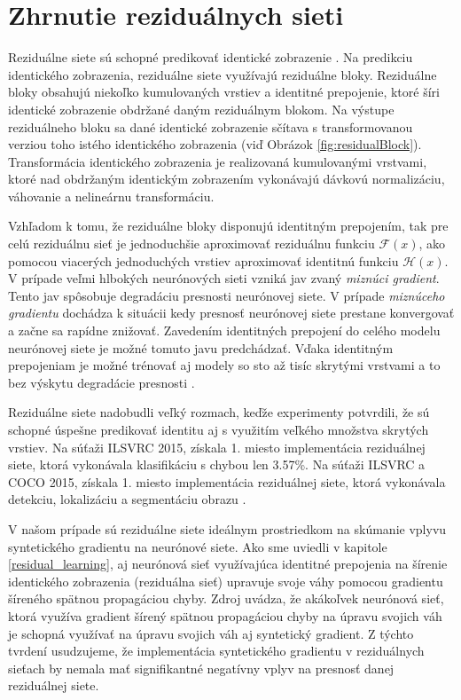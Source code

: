 \section{Zhrnutie reziduálnych sieti}
\label{conclusionResNet}

Reziduálne siete sú schopné predikovať identické zobrazenie \cite{Wu2017, He2016, Targ2016}. Na predikciu identického zobrazenia, reziduálne siete využívajú reziduálne bloky. Reziduálne bloky obsahujú niekoľko kumulovaných vrstiev a identitné prepojenie, ktoré šíri identické zobrazenie obdržané daným reziduálnym blokom. Na výstupe reziduálneho bloku sa dané identické zobrazenie sčítava s transformovanou verziou toho istého identického zobrazenia (viď Obrázok \ref{fig:residualBlock}). Transformácia identického zobrazenia je realizovaná kumulovanými vrstvami, ktoré nad obdržaným identickým zobrazením vykonávajú dávkovú normalizáciu, váhovanie a nelineárnu transformáciu.

Vzhľadom k tomu, že reziduálne bloky disponujú identitným prepojením, tak pre celú reziduálnu sieť je jednoduchšie aproximovať reziduálnu funkciu $\mathcal{F}(x)$, ako pomocou viacerých jednoduchých vrstiev aproximovať identitnú funkciu $\mathcal{H}(x)$. V prípade veľmi hlbokých neurónových sieti vzniká jav zvaný \textit{miznúci gradient}. Tento jav spôsobuje degradáciu presnosti neurónovej siete. V prípade \textit{miznúceho gradientu} dochádza k situácii kedy presnosť neurónovej siete prestane konvergovať a začne sa rapídne znižovať. Zavedením identitných prepojení do celého modelu neurónovej siete je možné tomuto javu predchádzať. Vďaka identitným prepojeniam je možné trénovať aj modely so sto až tisíc skrytými vrstvami a to bez výskytu degradácie presnosti \cite{Wu2017}.

Reziduálne siete nadobudli veľký rozmach, keďže experimenty potvrdili, že sú schopné úspešne predikovať identitu aj s využitím veľkého množstva skrytých vrstiev. Na súťaži ILSVRC 2015, získala 1. miesto implementácia reziduálnej siete, ktorá vykonávala klasifikáciu s chybou len 3.57\%. Na súťaži ILSVRC a COCO 2015, získala 1. miesto implementácia reziduálnej siete, ktorá vykonávala detekciu, lokalizáciu a segmentáciu obrazu \cite{Wu2017}.

V našom prípade sú reziduálne siete ideálnym prostriedkom na skúmanie vplyvu syntetického gradientu na neurónové siete. Ako sme uviedli v kapitole \ref{residual_learning}, aj neurónová sieť využívajúca identitné prepojenia na šírenie identického zobrazenia (reziduálna sieť) upravuje svoje váhy pomocou gradientu šíreného spätnou propagáciou chyby. Zdroj \cite{Jaderberg2016} uvádza, že akákoľvek neurónová sieť, ktorá využíva gradient šírený spätnou propagáciou chyby na úpravu svojich váh je schopná využívať na úpravu svojich váh aj syntetický gradient. Z týchto tvrdení usudzujeme, že implementácia syntetického gradientu v reziduálnych sieťach by nemala mať signifikantné negatívny vplyv na presnosť danej reziduálnej siete.